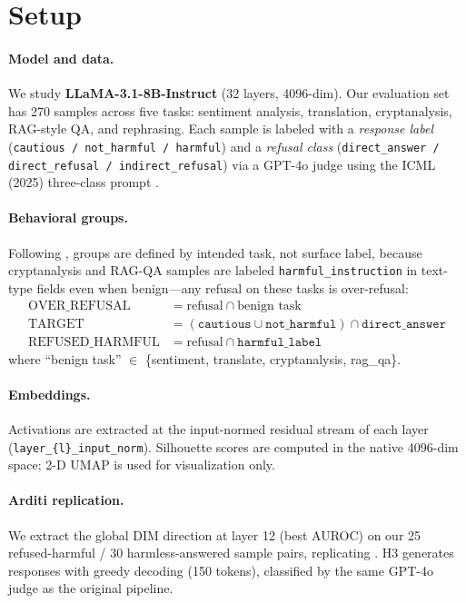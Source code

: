 \documentclass[11pt]{article}
\begin{document}
\section{Setup}
\label{sec:setup}

\paragraph{Model and data.}
We study \textbf{LLaMA-3.1-8B-Instruct} (32 layers, 4096-dim). Our evaluation set
has 270 samples across five tasks: sentiment analysis, translation, cryptanalysis,
RAG-style QA, and rephrasing. Each sample is labeled with a \emph{response label}
(\texttt{cautious / not\_harmful / harmful}) and a \emph{refusal class}
(\texttt{direct\_answer / direct\_refusal / indirect\_refusal}) via a GPT-4o
judge using the ICML (2025) three-class prompt \citep{safeconstellations2025}.

\paragraph{Behavioral groups.}
Following \citet{safeconstellations2025}, groups are defined by intended task, not
surface label, because cryptanalysis and RAG-QA samples are labeled \texttt{harmful\_instruction}
in text-type fields even when benign---any refusal on these tasks is over-refusal:
\begin{align*}
  \text{OVER\_REFUSAL} &= \text{refusal} \cap \text{benign task} \\
  \text{TARGET} &= (\texttt{cautious} \cup \texttt{not\_harmful}) \cap \texttt{direct\_answer} \\
  \text{REFUSED\_HARMFUL} &= \text{refusal} \cap \texttt{harmful\_label}
\end{align*}
where ``benign task'' $\in$ \{sentiment, translate, cryptanalysis, rag\_qa\}.

\paragraph{Embeddings.}
Activations are extracted at the input-normed residual stream of each layer
(\texttt{layer\_\{l\}\_input\_norm}). Silhouette scores are computed in the native
4096-dim space; 2-D UMAP is used for visualization only.

\paragraph{Arditi replication.}
We extract the global DIM direction at layer 12 (best AUROC) on our 25
refused-harmful / 30 harmless-answered sample pairs, replicating \citet{arditi2024refusal}.
H3 generates responses with greedy decoding (150 tokens), classified by the same
GPT-4o judge as the original pipeline.
\end{document}
